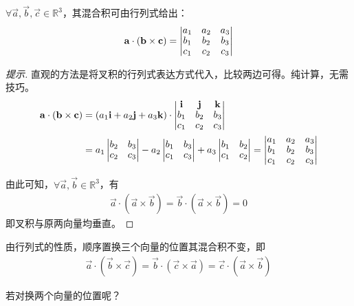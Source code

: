 \begin{theorem}
  $\forall \vec a,\vec b,\vec c\in\mathbb{R}^3$，其混合积可由行列式给出：
  \begin{align*}\renewcommand{\arraystretch}{.9}
    \vec a\cdot(\vec b\times\vec c) =
    \begin{vmatrix}
      a_1 & a_2 & a_3\\
      b_1 & b_2 & b_3\\
      c_1 & c_2 & c_3
    \end{vmatrix}
  \end{align*}
\end{theorem}
\begin{proof}[提示]
  直观的方法是将叉积的行列式表达方式代入，比较两边可得。纯计算，无需技巧。
  \begin{align*}\renewcommand{\arraystretch}{.9}
    \vec a\cdot (\vec b\times \vec c) ={}& (a_1\vec i + a_2\vec j + a_3\vec k) \cdot
    \begin{vmatrix}
      \vec i & \vec j & \vec k\\
      b_1 & b_2 & b_3\\
      c_1 & c_2 & c_3
    \end{vmatrix}\\
    ={}& a_1 \begin{vmatrix} b_2 & b_3\\ c_2 & c_3  \end{vmatrix}
       - a_2 \begin{vmatrix} b_1 & b_3\\ c_1 & c_3  \end{vmatrix}
       + a_3 \begin{vmatrix} b_1 & b_2\\ c_1 & c_2  \end{vmatrix}
      =
      \begin{vmatrix}
        a_1 & a_2 & a_3\\
        b_1 & b_2 & b_3\\
        c_1 & c_2 & c_3
      \end{vmatrix}
  \end{align*}

  由此可知，$\forall \vec a, \vec b\in\mathbb{R}^3$，有
  \begin{align*}
    \vec a\cdot (\vec a\times \vec b) = \vec b\cdot(\vec a\times \vec b) = 0
  \end{align*}
  即叉积与原两向量均垂直。
\end{proof}

\begin{example}由行列式的性质，顺序置换三个向量的位置其混合积不变，即
  \def\scalarTripleProd[#1,#2,#3]{
    \vec {#1}\cdot(\vec {#2}\times\vec #3)
  }
  \begin{align*}
    \scalarTripleProd[a,b,c] =
    \scalarTripleProd[b,c,a] =
    \scalarTripleProd[c,a,b]
  \end{align*}

  \think 若对换两个向量的位置呢？
\end{example}

